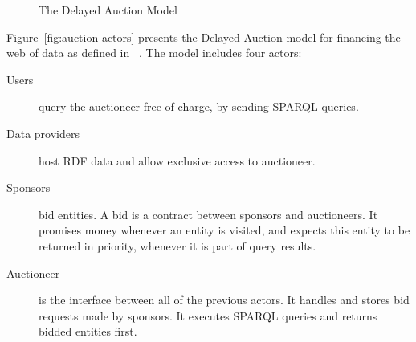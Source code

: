 \documentclass[runningheads]{llncs}
\begin{document}
\begin{figure}
  
  \label{fig:auction}
  \centering
%

\caption{The Delayed Auction Model}
\end{figure}

Figure~\ref{fig:auction-actors} presents the Delayed Auction model for financing the web of data
as defined in~ \cite{DBLP:conf/www/GrubenmannBMS18}.  The  model includes four actors:

\begin{description}

\item[Users] query the auctioneer free of charge, by sending SPARQL
  queries.
  
\item[Data providers] host RDF data and allow exclusive access to auctioneer.

\item[Sponsors] bid entities. A bid is a contract between sponsors and
  auctioneers. It promises money whenever an entity is visited, and
  expects this entity to be returned in priority,  whenever it is part
  of query results.

\item[Auctioneer] is the interface between all of the previous
  actors.  It handles and stores bid requests made by sponsors. It
  executes SPARQL queries and returns bidded entities first.

\end{description}
\end{document}
